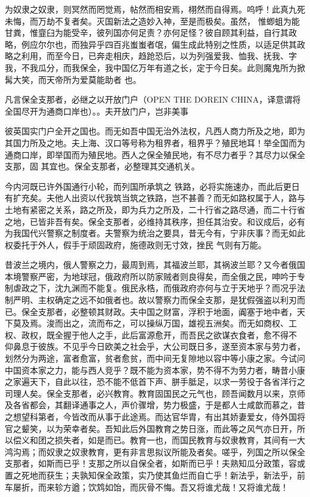 \documentclass{article}
\begin{document}
为奴隶之奴隶，则冥然而罔觉焉，帖然而相安焉，栩然而自得焉。呜呼！此真九死未悔，而万劫不复者矣。灭国新法之造妙入神，至是而极矣。虽然，
\newpage
惟蝍蛆为能甘粪，惟韲臼为能受辛，彼列国亦何足责？亦何足怪？彼自顾其利益，自行其政略，例应尔尔也，而独异乎四百兆蚩蚩者氓，偏生成此特别之性质，以适足供其政略之利用，而至今日，已奔走相庆，趋跄恐后，以为列强爱我、恤我、抚我、字我，不我瓜分，而我保全，我中国亿万年有道之长，定于今日矣。此则魔鬼所为掀髯大笑，而天帝所为爱莫能助者
也。 

凡言保全支那者，必继之以开放门户（OPEN THE DOREIN CHINA，译意谓将全国尽开为通商口岸也）。。夫开放门户，岂非美事

彼英国实门户全开之国也。而无如吾中国无治外法权，凡西人商力所及之地，即为其国力所及之地。夫上海、汉口等号称为租界者，租界乎？殖民地耳！举全国而为通商口岸，即举国而为殖民地。西人之保全殖民地，有不尽力者乎？其尽力以保全支那，固
其宜也。保全支那者，必整理其交通机关。 

今内河既已许外国通行小轮，而列国所承筑之
\newpage
铁路，必将实施速办，而此后更日有扩充矣。夫他人出资以代我筑当筑之铁路，岂不甚善？而无如路权属于人，路与土地有紧密之关系，路之所及，即为兵力之所及，二十行省之路尽通，而二十行省之地，已皆非吾有矣。保全支那者，必维持其秩序，担任其治安。和议成后，必有为我国代兴警察之制度者。夫警察为统治之要具，昔无今有，宁非庆事？而无如此权委托于外人，假手于顽固政府，施德政则无寸效，挫民
气则有万能。 

昔波兰之境内，俄人警察之力，最周到焉，其福波兰耶，其祸波兰耶？又今者俄国本境警察严密，为地球冠，俄政府所以防家贼者则良得矣，而全俄之民，呻吟于专制虐政之下，沈九渊而不能复。俄民永梏，而俄政府亦何与立于天地乎？而况乎法制严明、主权确定之远不如俄者也。故以警察力而保全支那，是犹假强盗以利刃而已。保全支那者，必整顿其财政。夫中国之财富，浮积于地面，阗塞于地中者，天下莫及焉。浚而出之，流而布之，可以操纵万国，雄视五洲矣。而无如商权、工权、政权，既全握于他人之手，此后富源愈开，而吾民之欲谋衣食者，愈不得不
\newpage
仰鼻息于彼族。不见乎今日欧美之社会乎，大公司既日多，遂至资本家与劳力者，划然分为两途，富者愈富，贫者愈贫，而中间无复隙地以容中等小康之家。今试问中国资本家之力，能与西人竞乎？既不能为资本家，势不得不为劳力者，畴昔小康之家遍天下，自此以往，恐不能不低首下声、胼手胝足，以求一劳役于各省洋行之司理人矣。保全支那者，必兴教育。教育固国民之元气也，顾吾闻数月以来，京师及各省都会，其翻译通事之人，声价骤增，势力极盛，于是都人士咸歆而慕之，昔之想望科第者，今皆改而从事于此途焉。而达官华胄，有出其娇妻爱女，侍外国将官之颦笑，以为荣幸者矣。吾知此后外国教育之势日涨，而此等之风气亦日开，所以偿义和团之损失者，如是而已。教育一也，而国民教育与奴隶教育，其间有一大鸿沟焉；而奴隶之奴隶教育，更有非言思拟议所能及者矣。嗟乎，列国之所以保全支那者，如斯而已乎！支那之所以自保全者，如斯而已乎！夫熟知瓜分政策，容或置之死地而获生；夫孰知保全政策，实乃使其鱼烂而自亡乎！新法乎，新法乎，前车屡折，而来轸方遒；饮鸩如饴，而灰骨不悔。吾又将谁尤哉！又将谁尤哉！
\newpage
\end{document}
